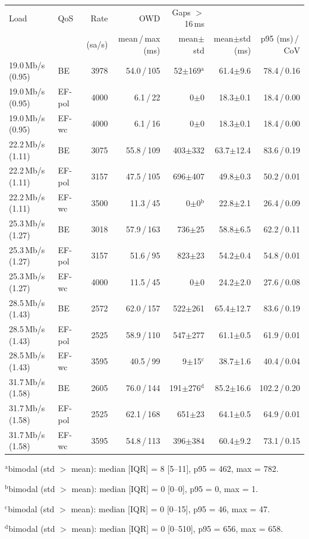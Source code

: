 \begin{tabular}{llrrrrr}
\toprule
Load & QoS & Rate & OWD & Gaps $>$16\,ms & \ttrip{} & \ttrip{} \\
 & & (sa/s) & mean\,/\,max (ms) & mean$\pm$std & mean$\pm$std (ms) & p95 (ms)\,/\,CoV \\
\midrule
19.0\,Mb/s (0.95) & BE & 3978 & 54.0\,/\,105 & 52$\pm$169$^{\mathrm{a}}$ & 61.4$\pm$9.6 & 78.4\,/\,0.16 \\
19.0\,Mb/s (0.95) & EF-pol & 4000 & 6.1\,/\,22 & 0$\pm$0 & 18.3$\pm$0.1 & 18.4\,/\,0.00 \\
19.0\,Mb/s (0.95) & EF-wc & 4000 & 6.1\,/\,16 & 0$\pm$0 & 18.3$\pm$0.1 & 18.4\,/\,0.00 \\
22.2\,Mb/s (1.11) & BE & 3075 & 55.8\,/\,109 & 403$\pm$332 & 63.7$\pm$12.4 & 83.6\,/\,0.19 \\
22.2\,Mb/s (1.11) & EF-pol & 3157 & 47.5\,/\,105 & 696$\pm$407 & 49.8$\pm$0.3 & 50.2\,/\,0.01 \\
22.2\,Mb/s (1.11) & EF-wc & 3500 & 11.3\,/\,45 & 0$\pm$0$^{\mathrm{b}}$ & 22.8$\pm$2.1 & 26.4\,/\,0.09 \\
25.3\,Mb/s (1.27) & BE & 3018 & 57.9\,/\,163 & 736$\pm$25 & 58.8$\pm$6.5 & 62.2\,/\,0.11 \\
25.3\,Mb/s (1.27) & EF-pol & 3157 & 51.6\,/\,95 & 823$\pm$23 & 54.2$\pm$0.4 & 54.8\,/\,0.01 \\
25.3\,Mb/s (1.27) & EF-wc & 4000 & 11.5\,/\,45 & 0$\pm$0 & 24.2$\pm$2.0 & 27.6\,/\,0.08 \\
28.5\,Mb/s (1.43) & BE & 2572 & 62.0\,/\,157 & 522$\pm$261 & 65.4$\pm$12.7 & 83.6\,/\,0.19 \\
28.5\,Mb/s (1.43) & EF-pol & 2525 & 58.9\,/\,110 & 547$\pm$277 & 61.1$\pm$0.5 & 61.9\,/\,0.01 \\
28.5\,Mb/s (1.43) & EF-wc & 3595 & 40.5\,/\,99 & 9$\pm$15$^{\mathrm{c}}$ & 38.7$\pm$1.6 & 40.4\,/\,0.04 \\
31.7\,Mb/s (1.58) & BE & 2605 & 76.0\,/\,144 & 191$\pm$276$^{\mathrm{d}}$ & 85.2$\pm$16.6 & 102.2\,/\,0.20 \\
31.7\,Mb/s (1.58) & EF-pol & 2525 & 62.1\,/\,168 & 651$\pm$23 & 64.1$\pm$0.5 & 64.9\,/\,0.01 \\
31.7\,Mb/s (1.58) & EF-wc & 3595 & 54.8\,/\,113 & 396$\pm$384 & 60.4$\pm$9.2 & 73.1\,/\,0.15 \\
\bottomrule
\end{tabular}
\par\smallskip\footnotesize $^{\mathrm{a}}$bimodal (std $>$ mean): median [IQR] = 8 [5--11], p95 = 462, max = 782.
\par\smallskip\footnotesize $^{\mathrm{b}}$bimodal (std $>$ mean): median [IQR] = 0 [0--0], p95 = 0, max = 1.
\par\smallskip\footnotesize $^{\mathrm{c}}$bimodal (std $>$ mean): median [IQR] = 0 [0--15], p95 = 46, max = 47.
\par\smallskip\footnotesize $^{\mathrm{d}}$bimodal (std $>$ mean): median [IQR] = 0 [0--510], p95 = 656, max = 658.
